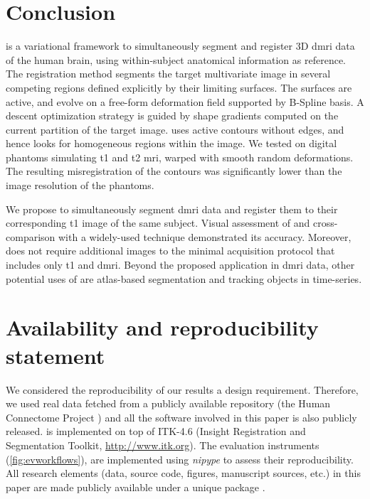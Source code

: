 \section*{Conclusion}
\label{sec:conclusion}

\Regseg{} is a variational framework to simultaneously segment and
  register 3D \gls*{dmri} data of the human brain, using within-subject
  anatomical information as reference.
The registration method segments the target multivariate image in several competing regions
  defined explicitly by their limiting surfaces.
The surfaces are active, and evolve on a free-form deformation field supported by B-Spline basis.
A descent optimization strategy is guided by shape gradients computed on the current partition
  of the target image.
\Regseg{} uses active contours without edges, and hence looks for
  homogeneous regions within the image.
We tested \regseg{} on digital phantoms simulating \gls*{t1} and \gls*{t2} \gls*{mri},
	warped with smooth random deformations.
The resulting misregistration of the contours was significantly lower than the image resolution
  of the phantoms.

We propose \regseg{} to simultaneously segment \gls*{dmri} data and register them to
  their corresponding \gls*{t1} image of the same subject.
Visual assessment of \regseg{} and cross-comparison with a widely-used technique demonstrated 
  its accuracy.
Moreover, \regseg{} does not require additional images to the minimal acquisition protocol
  that includes only \gls*{t1} and \gls*{dmri}.
Beyond the proposed application in \gls*{dmri} data, other potential uses of \regseg{} are
  atlas-based segmentation and tracking objects in time-series.


\section*{Availability and reproducibility statement}
\label{sec:availability}
We considered the reproducibility of our results a design requirement.
Therefore, we used real data fetched from a publicly available repository
  (the Human Connectome Project \citep{essen_human_2012}) and all the software
  involved in this paper is also publicly released.
\Regseg{} is implemented on top of ITK-4.6 (Insight Registration and 
  Segmentation Toolkit, \url{http://www.itk.org}).
The evaluation instruments (\autoref{fig:evworkflows}), are implemented using
  \emph{nipype} \citep{gorgolewski_nipype_2011} to assess their reproducibility.
All research elements (data, source code, figures, manuscript sources, etc.) in this paper
  are made publicly available under a unique package \citep{esteban_acweregistration_2015}.